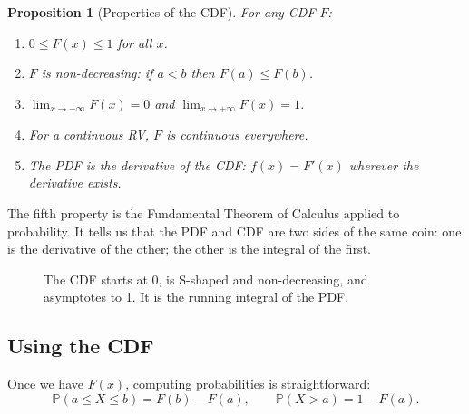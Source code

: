\documentclass[12pt, a4paper, oneside]{book}
\theoremstyle{definition}
\theoremstyle{plain}
\newtheorem{proposition}{Proposition}[section]
\theoremstyle{remark}
\newcommand{\Prob}{\mathbb{P}}
\begin{document}
\begin{proposition}[Properties of the CDF]
For any CDF $F$:
\begin{enumerate}[label=\textbf{(\roman*)}]
  \item $0 \le F(x) \le 1$ for all $x$.
  \item $F$ is non-decreasing: if $a < b$ then $F(a) \le F(b)$.
  \item $\lim_{x\to-\infty} F(x) = 0$ and $\lim_{x\to+\infty} F(x) = 1$.
  \item For a \emph{continuous} RV, $F$ is continuous everywhere.
  \item The PDF is the derivative of the CDF:
        $f(x) = F'(x)$ wherever the derivative exists.
\end{enumerate}
\end{proposition}

The fifth property is the Fundamental Theorem of Calculus applied to
probability.  It tells us that the PDF and CDF are two sides of the same
coin: one is the derivative of the other; the other is the integral of the first.

\begin{figure}[h]
\centering
{}
\caption{The CDF starts at 0, is S-shaped and non-decreasing, and
  asymptotes to 1.  It is the running integral of the PDF.}
\label{fig:cdf}
\end{figure}

\subsection{Using the CDF}

Once we have $F(x)$, computing probabilities is straightforward:
\[
  \Prob(a \le X \le b) = F(b) - F(a), \qquad
  \Prob(X > a) = 1 - F(a).
\]
\end{document}
